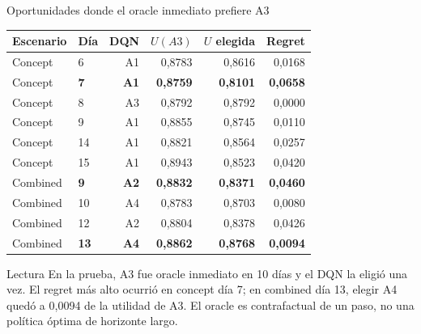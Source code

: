 \documentclass[aspectratio=169,10pt]{beamer}
\begin{document}
\begin{frame}{Oportunidades donde el oracle inmediato prefiere A3}
\centering
\scriptsize
\begin{tabular}{llrrrr}
\toprule
Escenario & Día & DQN & \(U(A3)\) & \(U\) elegida & Regret \\
\midrule
Concept & 6 & A1 & 0,8783 & 0,8616 & 0,0168 \\
Concept & \textbf{7} & \textbf{A1} & \textbf{0,8759} & \textbf{0,8101} & \textbf{0,0658} \\
Concept & 8 & A3 & 0,8792 & 0,8792 & 0,0000 \\
Concept & 9 & A1 & 0,8855 & 0,8745 & 0,0110 \\
Concept & 14 & A1 & 0,8821 & 0,8564 & 0,0257 \\
Concept & 15 & A1 & 0,8943 & 0,8523 & 0,0420 \\
Combined & \textbf{9} & \textbf{A2} & \textbf{0,8832} & \textbf{0,8371} & \textbf{0,0460} \\
Combined & 10 & A4 & 0,8783 & 0,8703 & 0,0080 \\
Combined & 12 & A2 & 0,8804 & 0,8378 & 0,0426 \\
Combined & \textbf{13} & \textbf{A4} & \textbf{0,8862} & \textbf{0,8768} & \textbf{0,0094} \\
\bottomrule
\end{tabular}

\vspace{0.5em}
\begin{block}{Lectura}
En la prueba, A3 fue oracle inmediato en 10 días y el DQN la eligió una vez.
El regret más alto ocurrió en concept día 7; en combined día 13, elegir A4
quedó a 0,0094 de la utilidad de A3. El oracle es contrafactual de un paso,
no una política óptima de horizonte largo.
\end{block}
\end{frame}
\end{document}
